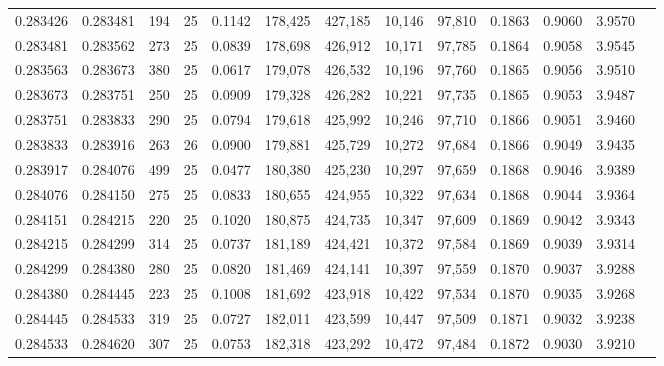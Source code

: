 \begin{tabular}{rrrrrrrrrrrrr}
0.283426 & 0.283481 &   194 &  25 &                                     0.1142 & 178,425 & 427,185 &  10,146 &  97,810 & 0.1863 & 0.9060 & 3.9570 \\
0.283481 & 0.283562 &   273 &  25 &                                     0.0839 & 178,698 & 426,912 &  10,171 &  97,785 & 0.1864 & 0.9058 & 3.9545 \\
0.283563 & 0.283673 &   380 &  25 &                                     0.0617 & 179,078 & 426,532 &  10,196 &  97,760 & 0.1865 & 0.9056 & 3.9510 \\
0.283673 & 0.283751 &   250 &  25 &                                     0.0909 & 179,328 & 426,282 &  10,221 &  97,735 & 0.1865 & 0.9053 & 3.9487 \\
0.283751 & 0.283833 &   290 &  25 &                                     0.0794 & 179,618 & 425,992 &  10,246 &  97,710 & 0.1866 & 0.9051 & 3.9460 \\
0.283833 & 0.283916 &   263 &  26 &                                     0.0900 & 179,881 & 425,729 &  10,272 &  97,684 & 0.1866 & 0.9049 & 3.9435 \\
0.283917 & 0.284076 &   499 &  25 &                                     0.0477 & 180,380 & 425,230 &  10,297 &  97,659 & 0.1868 & 0.9046 & 3.9389 \\
0.284076 & 0.284150 &   275 &  25 &                                     0.0833 & 180,655 & 424,955 &  10,322 &  97,634 & 0.1868 & 0.9044 & 3.9364 \\
0.284151 & 0.284215 &   220 &  25 &                                     0.1020 & 180,875 & 424,735 &  10,347 &  97,609 & 0.1869 & 0.9042 & 3.9343 \\
0.284215 & 0.284299 &   314 &  25 &                                     0.0737 & 181,189 & 424,421 &  10,372 &  97,584 & 0.1869 & 0.9039 & 3.9314 \\
0.284299 & 0.284380 &   280 &  25 &                                     0.0820 & 181,469 & 424,141 &  10,397 &  97,559 & 0.1870 & 0.9037 & 3.9288 \\
0.284380 & 0.284445 &   223 &  25 &                                     0.1008 & 181,692 & 423,918 &  10,422 &  97,534 & 0.1870 & 0.9035 & 3.9268 \\
0.284445 & 0.284533 &   319 &  25 &                                     0.0727 & 182,011 & 423,599 &  10,447 &  97,509 & 0.1871 & 0.9032 & 3.9238 \\
0.284533 & 0.284620 &   307 &  25 &                                     0.0753 & 182,318 & 423,292 &  10,472 &  97,484 & 0.1872 & 0.9030 & 3.9210 \\

\end{tabular}

